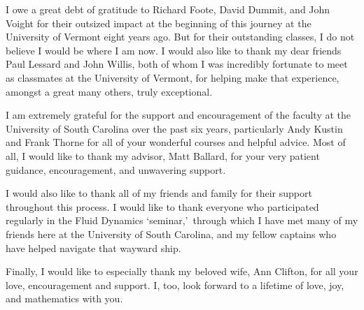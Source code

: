 I owe a great debt of gratitude to Richard Foote, David Dummit, and John Voight for their outsized impact at the beginning of this journey at the University of Vermont eight years ago.
But for their outstanding classes, I do not believe I would be where I am now.
I would also like to thank my dear friends Paul Lessard and John Willis, both of whom I was incredibly fortunate to meet as classmates at the University of Vermont, for helping make that experience, amongst a great many others, truly exceptional.

I am extremely grateful for the support and encouragement of the faculty at the University of South Carolina over the past six years, particularly Andy Kustin and Frank Thorne for all of your wonderful courses and helpful advice.
Most of all, I would like to thank my advisor, Matt Ballard, for your very patient guidance, encouragement, and unwavering support.

I would also like to thank all of my friends and family for their support throughout this process.
I would like to thank everyone who participated regularly in the Fluid Dynamics \lq seminar,\rq\, through which I have met many of my friends here at the University of South Carolina, and my fellow captains who have helped navigate that wayward ship.

Finally, I would like to especially thank my beloved wife, Ann Clifton, for all your love, encouragement and support.
I, too, look forward to a lifetime of love, joy, and mathematics with you.
